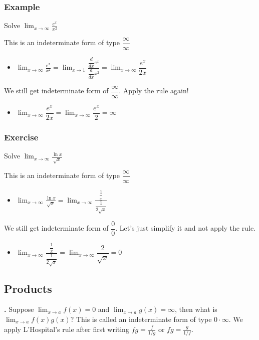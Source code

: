 \documentclass[t]{beamer}
\theoremstyle{plain}
\theoremstyle{definition}
\newcommand{\ds}{\displaystyle}
\newcounter{heading}
\newcommand{\newhead}[1]{\medskip\stepcounter{heading}\noindent\textbf{\hspace{0.2cm}{#1}.}}
\newcommand{\limm}[1]{\displaystyle \lim_{x\to #1}}
\begin{document}
\begin{frame}

\frametitle{Example}

Solve $\limm{\infty}\ds\frac{e^{x}}{x^{2}}$

This is an indeterminate form of type $\dfrac{\infty}{\infty}$  \pause

\begin{itemize}
	\item $\limm{\infty}\ds\frac{e^{x}}{x^{2}}= \limm{1}\ds\frac{\dfrac{d}{dx}e^{x}}{\dfrac{d}{dx}x^{2}} = \limm{\infty}\dfrac{e^{x}}{2x}$
\end{itemize}

We still get indeterminate form of  $\dfrac{\infty}{\infty}$.   Apply the rule again! 

\begin{itemize}
	\item $ \limm{\infty}\dfrac{e^{x}}{2x} = \limm{\infty}\dfrac{e^{x}}{2} = \infty$
\end{itemize}

\end{frame}

\begin{frame}

\frametitle{Exercise}

Solve $\limm{\infty}\ds\frac{\ln x}{\sqrt{x}}$

This is an indeterminate form of type $\dfrac{\infty}{\infty}$  \pause

\begin{itemize}
	\item $\limm{\infty}\ds\frac{\ln x}{\sqrt{x}} = \limm{\infty}\ds\frac{\dfrac{1}{x}}{\dfrac{1}{2\sqrt{x}}} $
\end{itemize}

We still get indeterminate form of  $\dfrac{0}{0}$.   Let's just simplify it and not apply the rule. 

\begin{itemize}
	\item $\limm{\infty}\ds\frac{\dfrac{1}{x}}{\dfrac{1}{2\sqrt{x}}} = \limm{\infty}\dfrac{2}{\sqrt{x}} = 0$
\end{itemize}

\end{frame}

\subsection{Products}


\begin{frame}
\newhead{Indeterminate forms with products}
\noindent Suppose $\limm{a}f(x) = 0$ and $\limm{a}g(x) = \infty$, then what is $\limm{a}f(x)g(x)$?  This is called an indeterminate form of type $0\cdot\infty$.  We apply L'Hospital's rule after first writing $fg = \frac{f}{1/g}$ or $fg = \frac{g}{1/f}$.

\end{frame}
\end{document}

